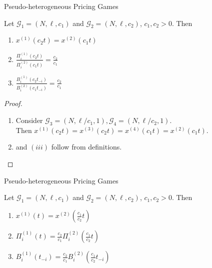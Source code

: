 \documentclass{beamer}
\newcommand{\Gm}{\mathcal{G}}
\begin{document}
\begin{frame}{Pseudo-heterogeneous Pricing Games}
\begin{lemma}
	Let $\Gm_1 = (N, \ell, c_1)$ and $\Gm_2 = (N, \ell, c_2)$, $c_1, c_2 > 0$.
	Then
	\begin{enumerate}[$(i)$]
		\item $x^{(1)}(c_2 t) = x^{(2)}(c_1 t)$
		\item $\frac{\Pi_i^{(1)}(c_2 t)}{\Pi_i^{(2)}(c_1 t)} = \frac{c_2}{c_1}$
		\item $\frac{B_i^{(1)}(c_2t_{-i})}{B_i^{(2)}(c_1 t_{-i})} = \frac{c_2}{c_1}$
	\end{enumerate}
\end{lemma}
\begin{proof}
	\begin{enumerate}[$(i)$]
		\item Consider $\Gm_3 = (N, \ell/c_1, 1), \Gm_4 = (N, \ell/c_2, 1)$.\\
		Then $x^{(1)}(c_2 t) = x^{(3)}(c_2 t) = x^{(4)}(c_1 t) = x^{(2)}(c_1 t)$.
		\item and $(iii)$ follow from definitions.
		\vspace{-20pt}
	\end{enumerate}
\end{proof}
\end{frame}

\begin{frame}{Pseudo-heterogeneous Pricing Games}
	\begin{lemma}
		Let $\Gm_1 = (N, \ell, c_1)$ and $\Gm_2 = (N, \ell, c_2)$, $c_1, c_2 > 0$.
		Then
		\begin{enumerate}[$(i)$]
			\item $x^{(1)}(t) = x^{(2)}\left(\frac{c_1}{c_2} t\right)$
			\item $\Pi_i^{(1)}(t) = \frac{c_2}{c_1} \Pi_i^{(2)}\left(\frac{c_1}{c_2} t\right)$
			\item $B_i^{(1)}(t_{-i}) = \frac{c_2}{c_1} B_i^{(2)}\left(\frac{c_1}{c_2} t_{-i}\right)$
		\end{enumerate}
	\end{lemma}
\end{frame}
\end{document}
